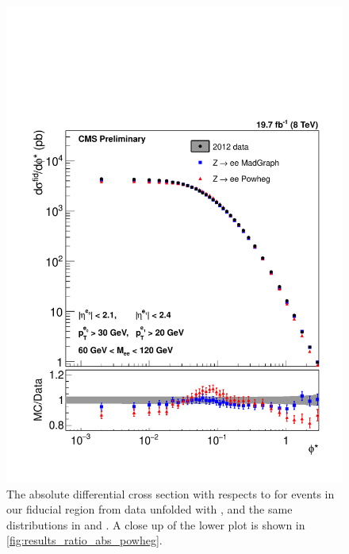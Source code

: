 \begin{figure}[!p]
    \centering
    \includegraphics[width=\textwidth]{figures/ZShape_elec_PH_Abs_Dressed.pdf}
    \caption[
        The absolute differential cross section with respects to \phistar for
        \Ztoee events in our fiducial region from data unfolded with \POWHEG,
        and the same distributions in \MADGRAPH and \POWHEG.
    ]{
        The absolute differential cross section with respects to \phistar for
        \Ztoee events in our fiducial region from data unfolded with \POWHEG,
        and the same distributions in \MADGRAPH and \POWHEG. A close up of the
        lower plot is shown in \cref{fig:results_ratio_abs_powheg}.
    }
    \label{fig:results_abs_powheg}
\end{figure}

